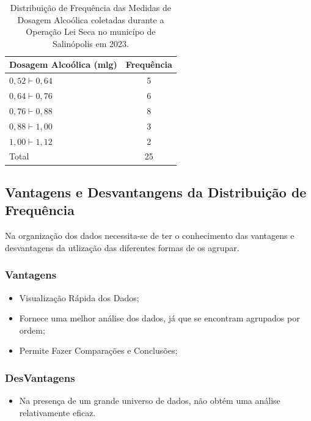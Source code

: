 \begin{table}[!htb]
    \centering
    {
    \caption{Distribuição de Frequência das Medidas de Dosagem Alcoólica coletadas durante a Operação Lei Seca no municípo de Salinópolis em 2023.}
    \label{toxalimentar}
    \vspace{-0.1cm}
\begin{tabular}{l|c}
  \hline\hline
  Dosagem Alcoólica (mlg) & Frequência \\
  \hline\hline
  $0,52 \vdash 0,64$ & 5 \\
  $0,64 \vdash 0,76$ & 6 \\
  $0,76 \vdash 0,88$ & 8 \\
  $0,88 \vdash 1,00$ & 3 \\
  $1,00 \vdash 1,12$ & 2 \\
  \hline\hline
  Total & 25 \\
    \hline\hline
\end{tabular}}
\end{table}


\newpage
\subsection{Vantagens e Desvantangens da Distribuição de Frequência}

Na organização dos dados necessita-se de ter o conhecimento das vantagens e desvantagens da utlização das diferentes formas de os agrupar.\vskip0.3cm

\subsubsection{Vantagens}

\begin{itemize}
    \item Visualização Rápida dos Dados;
    \item Fornece uma melhor análise dos dados, já que se encontram agrupados por ordem;
    \item Permite Fazer Comparações e Conclusões;
\end{itemize}

\subsubsection{DesVantagens}

\begin{itemize}
    \item Na presença de um grande universo de dados, não obtém uma análise relativamente eficaz.
\end{itemize}















